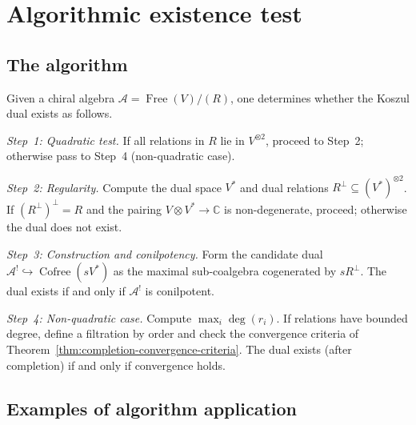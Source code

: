 
\section{Algorithmic existence test}
\label{sec:algorithmic-test}

\subsection{The algorithm}

\begin{construction}\label{con:koszul-dual-existence}
Given a chiral algebra $\mathcal{A} = \operatorname{Free}(V) / (R)$, one determines whether the Koszul dual exists as follows.

\emph{Step~1: Quadratic test.}
If all relations in $R$ lie in $V^{\otimes 2}$, proceed to Step~2; otherwise pass to Step~4 (non-quadratic case).

\emph{Step~2: Regularity.}
Compute the dual space $V^*$ and dual relations $R^\perp \subseteq (V^*)^{\otimes 2}$.  If $(R^\perp)^\perp = R$ and the pairing $V \otimes V^* \to \mathbb{C}$ is non-degenerate, proceed; otherwise the dual does not exist.

\emph{Step~3: Construction and conilpotency.}
Form the candidate dual $\mathcal{A}^! \hookrightarrow \operatorname{Cofree}(sV^*)$ as the maximal sub-coalgebra cogenerated by $sR^\perp$.  The dual exists if and only if $\mathcal{A}^!$ is conilpotent.

\emph{Step~4: Non-quadratic case.}
Compute $\max_i \deg(r_i)$.  If relations have bounded degree, define a filtration by order and check the convergence criteria of Theorem~\ref{thm:completion-convergence-criteria}.  The dual exists (after completion) if and only if convergence holds.
\end{construction}

\subsection{Examples of algorithm application}

